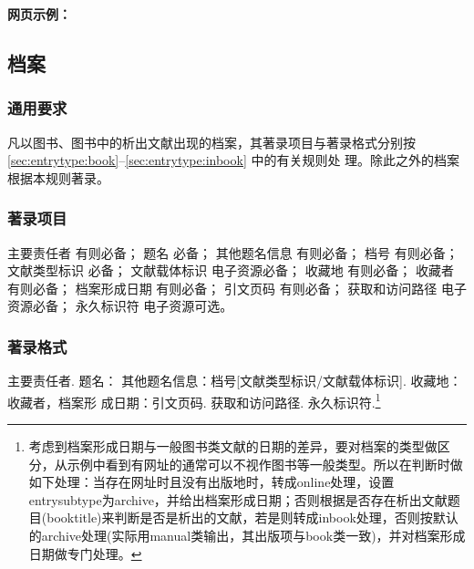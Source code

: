 \documentclass[twoside]{article}%
\begin{document}
\begin{refsection}

\nocite{北京市人民政府办公厅2005--,鲁迅博物馆2021,
杨立华2022,ISOHOME2020,ANTONIO2019,BEVINGTON2025,昨日之歌2015,
Zotero2024,仉尚航2024}


{


\textbf{网页示例：}

{\printbibliography[heading=none,env=indentegenv]}
}
\end{refsection}


\subsection{档案}\label{sec:entrytype:archive}

\subsubsection{通用要求}

凡以图书、图书中的析出文献出现的档案，其著录项目与著录格式分别按 \ref{sec:entrytype:book}--\ref{sec:entrytype:inbook} 中的有关规则处
理。除此之外的档案根据本规则著录。

\subsubsection{著录项目}

主要责任者 有则必备；
题名 必备；
其他题名信息 有则必备；
档号 有则必备；
文献类型标识 必备；
文献载体标识 电子资源必备；
收藏地 有则必备；
收藏者 有则必备；
档案形成日期 有则必备；
引文页码 有则必备；
获取和访问路径 电子资源必备；
永久标识符 电子资源可选。

\subsubsection{著录格式}

主要责任者. 题名： 其他题名信息：档号[文献类型标识/文献载体标识]. 收藏地： 收藏者，档案形
成日期：引文页码. 获取和访问路径. 永久标识符.\footnote{考虑到档案形成日期与一般图书类文献的日期的差异，要对档案的类型做区分，从示例中看到有网址的通常可以不视作图书等一般类型。所以在判断时做如下处理：当存在网址时且没有出版地时，转成online处理，设置entrysubtype为archive，并给出档案形成日期；否则根据是否存在析出文献题目(booktitle)来判断是否是析出的文献，若是则转成inbook处理，否则按默认的archive处理(实际用manual类输出，其出版项与book类一致)，并对档案形成日期做专门处理。}
\end{document}
